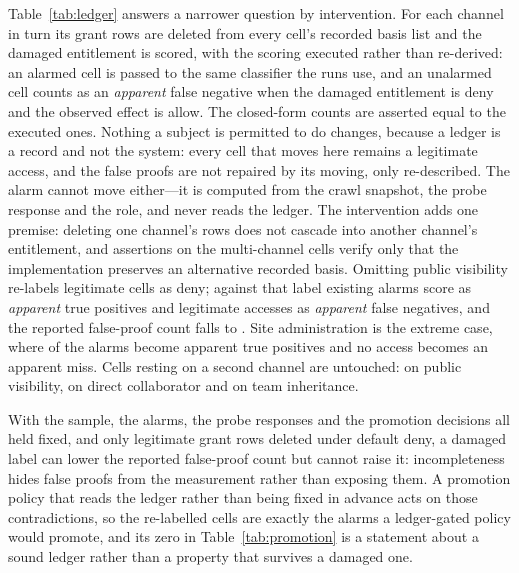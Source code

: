 Table~\ref{tab:ledger} answers a narrower question by intervention. For each channel in turn
its grant rows are deleted from every cell's recorded basis list and the damaged entitlement is
scored, with the scoring executed rather than re-derived: an alarmed cell is passed to the same
classifier the runs use, and an unalarmed cell counts as an \emph{apparent} false negative when
the damaged entitlement is deny and the observed effect is allow. The closed-form counts are
asserted equal to the executed ones. Nothing a subject is permitted to do changes, because a
ledger is a record and not the system: every cell that moves here remains a legitimate access,
and the \PolAlarms{} false proofs are not repaired by its moving, only re-described. The alarm
cannot move either---it is computed from the crawl snapshot, the probe response and the role,
and never reads the ledger. The intervention adds one premise: deleting one channel's rows does
not cascade into another channel's entitlement, and assertions on the \LedMultiBasis{}
multi-channel cells verify only that the implementation preserves an alternative recorded basis.
Omitting public visibility re-labels \LedPublicDeny{} legitimate cells as deny; against that
label \LedPublicTp{} existing alarms score as \emph{apparent} true positives and \LedPublicFn{}
legitimate accesses as \emph{apparent} false negatives, and the reported false-proof count falls
to \LedPublicFp{}. Site administration is the extreme case, where \LedSiteAdminTp{} of the
\PolAlarms{} alarms become apparent true positives and no access becomes an apparent miss.
Cells resting on a second channel are untouched: \LedPublicShared{} on public visibility,
\LedCollaboratorShared{} on direct collaborator and \LedTeamShared{} on team inheritance.

With the sample, the alarms, the probe responses and the promotion decisions all held fixed, and
only legitimate grant rows deleted under default deny, a damaged label can lower the reported
false-proof count but cannot raise it: incompleteness hides false proofs from the measurement
rather than exposing them. A promotion policy that reads the ledger rather than being fixed in
advance acts on those contradictions, so the \LedPublicTp{} re-labelled cells are exactly the
alarms a ledger-gated policy would promote, and its zero in Table~\ref{tab:promotion} is a
statement about a sound ledger rather than a property that survives a damaged one.



